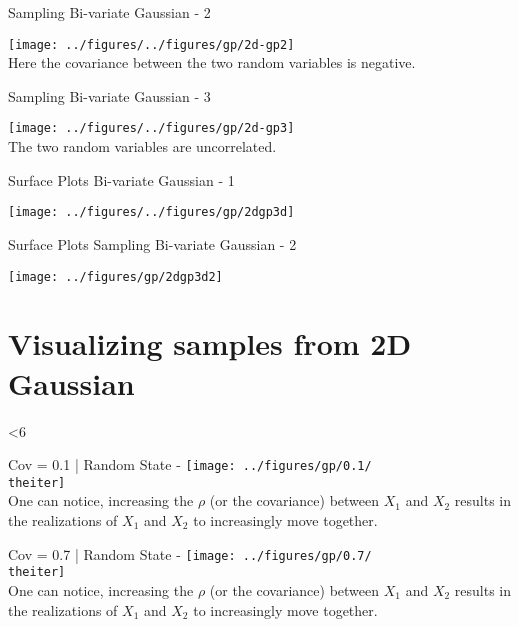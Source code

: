 \documentclass{beamer}
\begin{document}
	
	\begin{frame}{Sampling Bi-variate Gaussian - 2}
		\begin{center}
			\texttt{[image: ../figures/../figures/gp/2d-gp2]}\\
			Here the covariance between the two random variables is negative.
		\end{center}
	\end{frame}
	
	\begin{frame}{Sampling Bi-variate Gaussian - 3}
		\begin{center}
			\texttt{[image: ../figures/../figures/gp/2d-gp3]}\\
			The two random variables are uncorrelated.
		\end{center}
	\end{frame}
	
	\begin{frame}{Surface Plots Bi-variate Gaussian - 1}
		\begin{center}
			\texttt{[image: ../figures/../figures/gp/2dgp3d]}
		\end{center}
	\end{frame}
	
	\begin{frame}{Surface Plots Sampling Bi-variate Gaussian - 2}
		\begin{center}
			\texttt{[image: ../figures/gp/2dgp3d2]}
		\end{center}
	\end{frame}
	
	\section{Visualizing samples from 2D Gaussian}
	
	\setcounter{iter}{1}
	
	\loop
	\ifnum\value{iter}<6
		\begin{frame}{Cov = 0.1 | Random State - \theiter}
			\texttt{[image: ../figures/gp/0.1/\\theiter]}\\
			One can notice, increasing the $\rho$ (or the covariance) between $X_1$ and $X_2$ results in the realizations of $X_1$ and $X_2$ to increasingly move together.
		\end{frame}
	\repeat
	{%
		\begin{frame}{Cov = 0.7 | Random State - \theiter}
			\texttt{[image: ../figures/gp/0.7/\\theiter]}\\
			One can notice, increasing the $\rho$ (or the covariance) between $X_1$ and $X_2$ results in the realizations of $X_1$ and $X_2$ to increasingly move together.
		\end{frame}
	}
	
\end{document}
